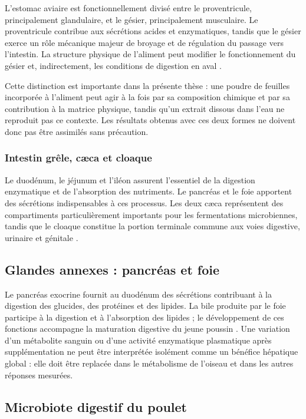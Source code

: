L'estomac aviaire est fonctionnellement divisé entre le proventricule, principalement glandulaire, et le gésier, principalement musculaire. Le proventricule contribue aux sécrétions acides et enzymatiques, tandis que le gésier exerce un rôle mécanique majeur de broyage et de régulation du passage vers l'intestin. La structure physique de l'aliment peut modifier le fonctionnement du gésier et, indirectement, les conditions de digestion en aval \citep{Svihus2014,RavindranAbdollahi2021}.

Cette distinction est importante dans la présente thèse : une poudre de feuilles incorporée à l'aliment peut agir à la fois par sa composition chimique et par sa contribution à la matrice physique, tandis qu'un extrait dissous dans l'eau ne reproduit pas ce contexte. Les résultats obtenus avec ces deux formes ne doivent donc pas être assimilés sans précaution.

\subsubsection{Intestin grêle, cæca et cloaque}

Le duodénum, le jéjunum et l'iléon assurent l'essentiel de la digestion enzymatique et de l'absorption des nutriments. Le pancréas et le foie apportent des sécrétions indispensables à ces processus. Les deux cæca représentent des compartiments particulièrement importants pour les fermentations microbiennes, tandis que le cloaque constitue la portion terminale commune aux voies digestive, urinaire et génitale \citep{RavindranAbdollahi2021,Oakley2014}.


\subsection{Glandes annexes : pancréas et foie}

Le pancréas exocrine fournit au duodénum des sécrétions contribuant à la digestion des glucides, des protéines et des lipides. La bile produite par le foie participe à la digestion et à l'absorption des lipides ; le développement de ces fonctions accompagne la maturation digestive du jeune poussin \citep{Svihus2014,RavindranAbdollahi2021}. Une variation d'un métabolite sanguin ou d'une activité enzymatique plasmatique après supplémentation ne peut être interprétée isolément comme un bénéfice hépatique global : elle doit être replacée dans le métabolisme de l'oiseau et dans les autres réponses mesurées.

\subsection{Microbiote digestif du poulet}

